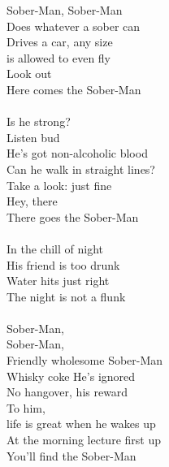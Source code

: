 
            Sober-Man, Sober-Man \\
            Does whatever a sober can \\
            Drives a car, any size \\
            is allowed to even fly \\
            Look out \\
            Here comes the Sober-Man \\
\hspace{10mm} \\
            Is he strong? \\
            Listen bud \\
            He's got non-alcoholic blood  \\
            Can he walk in straight lines? \\
            Take a look: just fine \\
            Hey, there \\
            There goes the Sober-Man \\
\hspace{10mm} \\
            In the chill of night \\
            His friend is too drunk \\
            Water hits just right \\
            The night is not a flunk \\
\hspace{10mm} \\
            Sober-Man, \\
            Sober-Man, \\
            Friendly wholesome Sober-Man  \\
            Whisky coke He's ignored \\
            No hangover, his reward \\
            To him, \\
            life is great when he wakes up  \\
            At the morning lecture first up \\
            You'll find the Sober-Man \\
